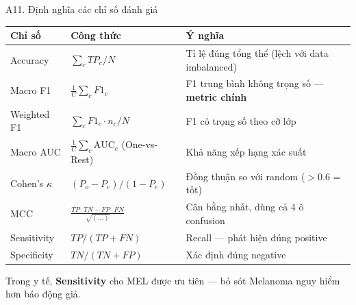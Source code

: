 \documentclass[10pt, aspectratio=169]{beamer}
\begin{document}
\begin{frame}{A11. Định nghĩa các chỉ số đánh giá}
    \scriptsize
    \begin{table}[]
        \centering
        \begin{tabular}{lll}
        \toprule
        \rowcolor{usthblue!25} \textbf{Chỉ số} & \textbf{Công thức} & \textbf{Ý nghĩa} \\
        \midrule
        Accuracy        & $\sum_c TP_c / N$                                  & Tỉ lệ đúng tổng thể (lệch với data imbalanced) \\
        Macro F1        & $\frac{1}{C}\sum_c F1_c$                           & F1 trung bình không trọng số --- \textbf{metric chính} \\
        Weighted F1     & $\sum_c F1_c \cdot n_c / N$                        & F1 có trọng số theo cỡ lớp \\
        Macro AUC       & $\frac{1}{C}\sum_c \mathrm{AUC}_c$ (One-vs-Rest)   & Khả năng xếp hạng xác suất \\
        Cohen's $\kappa$ & $(P_o - P_e)/(1 - P_e)$                           & Đồng thuận so với random ($>$0.6 = tốt) \\
        MCC             & $\frac{TP\cdot TN - FP\cdot FN}{\sqrt{(\dots)}}$   & Cân bằng nhất, dùng cả 4 ô confusion \\
        Sensitivity     & $TP/(TP+FN)$                                       & Recall --- phát hiện đúng positive \\
        Specificity     & $TN/(TN+FP)$                                       & Xác định đúng negative \\
        \bottomrule
        \end{tabular}
    \end{table}

    \vspace{0.2cm}
    Trong y tế, \textbf{Sensitivity} cho MEL được ưu tiên --- bỏ sót Melanoma nguy hiểm hơn báo động giả.
\end{frame}
\end{document}
